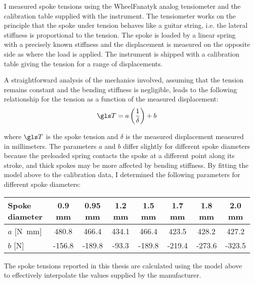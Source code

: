 \documentclass[../../thesis.tex]{subfiles}
\begin{document}
I measured spoke tensions using the WheelFanatyk analog tensiometer and the calibration table supplied with the instrument. The tensiometer works on the principle that the spoke under tension behaves like a guitar string, i.e. the lateral stiffness is proportional to the tension. The spoke is loaded by a linear spring with a precisely known stiffness and the displacement is measured on the opposite side as where the load is applied. The instrument is shipped with a calibration table giving the tension for a range of displacements.

A straightforward analysis of the mechanics involved, assuming that the tension remains constant and the bending stiffness is negligible, leads to the following relationship for the tension as a function of the measured displacement:
\begin{equation}
\T = a\left(\frac{1}{\delta}\right) + b
\end{equation}

where $\T$ is the spoke tension and $\delta$ is the measured displacement measured in millimeters. The parameters $a$ and $b$ differ slightly for different spoke diameters because the preloaded spring contacts the spoke at a different point along its stroke, and thick spokes may be more affected by bending stiffness. By fitting the model above to the calibration data, I determined the following parameters for different spoke diameters:

\begin{table}[h]
\begin{tabular}{l|ccccccc}
\hline
Spoke diameter & \bf 0.9 mm & \bf 0.95 mm & \bf 1.2 mm & \bf 1.5 mm & \bf 1.7 mm & \bf 1.8 mm & \bf 2.0 mm\\
\hline
$a$ [\si{N.mm}] &  480.8 &  466.4 & 434.1 &  466.4 &  423.5 &  428.2 &  427.2\\
$b$ [\si{N}]    & -156.8 & -189.8 & -93.3 & -189.8 & -219.4 & -273.6 & -323.5\\
\hline
\end{tabular}
\end{table}

The spoke tensions reported in this thesis are calculated using the model above to effectively interpolate the values supplied by the manufacturer.
\end{document}
